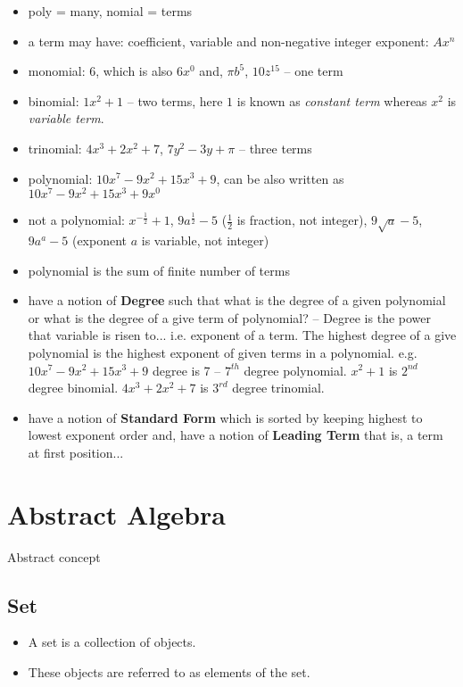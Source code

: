 \documentclass[a4paper]{article}
\begin{document}
\begin{itemize}
\item poly = many, nomial = terms
\item a term may have: coefficient, variable and non-negative integer exponent: $Ax^n$
\item monomial: $6$, which is also $6x^0$ and, $\pi b^5$, $10z^{15}$ -- one term
\item binomial: $1x^2 + 1$ -- two terms, here $1$ is known as \emph{constant term} whereas $x^2$ is \emph{variable term}.
\item trinomial: $4x^3 + 2x^2 + 7$, $7y^2 - 3y + \pi$ -- three terms
\item polynomial: $10x^7 - 9x^2 + 15x^3 + 9$, can be also written as $10x^7 - 9x^2 + 15x^3 + 9x^0$
\item not a polynomial: $x^{-\frac{1}{2}}+1$, $9a^{\frac{1}{2}}-5$ ($\frac{1}{2}$ is fraction, not integer), $9\sqrt{a} - 5$, $9a^a - 5$ (exponent $a$ is variable, not integer)
\item polynomial is the sum of finite number of terms
\item have a notion of \textbf{Degree} such that what is the degree of a given polynomial or what is the degree of a give term of polynomial? -- Degree is the power that variable is risen to... i.e. exponent of a term. The highest degree of a give polynomial is the highest exponent of given terms in a polynomial. e.g. $10x^7 - 9x^2 + 15x^3 + 9$ degree is 7 -- $7^{th}$ degree polynomial. $x^2 + 1$ is $2^{nd}$ degree binomial. $4x^3 + 2x^2 + 7$ is $3^{rd}$ degree trinomial.
\item have a notion of \textbf{Standard Form} which is sorted by keeping highest to lowest exponent order and, have a notion of \textbf{Leading Term} that is, a term at first position...
\end{itemize}



\newpage

\section{Abstract Algebra}

Abstract concept

\subsection{Set}

\begin{itemize}
\item A set is a collection of objects. 
\item These objects are referred to as elements of the set.
\end{itemize}
\end{document}
